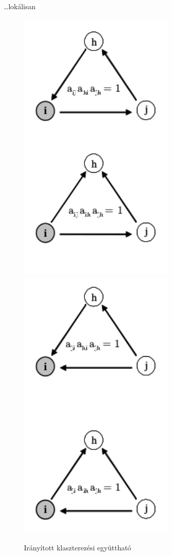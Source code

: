\documentclass{beamer}
\newlength{\onecolwid}
\begin{document}
\begin{frame}[t]
\begin{columns}[t]
\begin{column}{\onecolwid}
        \begin{block}{\dots lokálisan}
          \begin{figure}
            \includegraphics[width=7.5cm]{img/triangle-directions_1}
                \includegraphics[width=7.5cm]{img/triangle-directions_2} 
                \caption{Irányított klaszterezési együttható \citep{fagiolo2007clustering}}


\end{figure}
\end{block}
\end{column}
\end{columns}
\end{frame}
\end{document}
